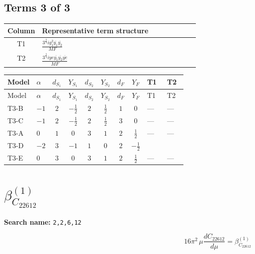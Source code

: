 \documentclass[8pt]{article}
\begin{document}
\begin{landscape}
\subsection*{Terms 3 of 3}
\begin{center}
\begin{tabular}{@{}c >{\raggedright\arraybackslash}p{0.82\linewidth}@{}}
\toprule
Column & Representative term structure \\
\midrule
T1 & \(\displaystyle \frac{3^{\frac{3}{4}} i g_{1}^{2} \overline{y_{1}} \overline{y_{2}}}{MF}\) \\
\midrule
T2 & \(\displaystyle \frac{3^{\frac{3}{4}} i ye \overline{y_{1}} \overline{y_{2}} \overline{ye}}{MF}\) \\
\midrule
\bottomrule
\end{tabular}
\end{center}
\smallskip
\tiny
\begin{longtable}{@{}llcccccc >{\raggedright\arraybackslash}p{0.21\linewidth} >{\raggedright\arraybackslash}p{0.21\linewidth}@{}}
\toprule
Model & $\alpha$ & $d_{S_1}$ & $Y_{S_1}$ & $d_{S_2}$ & $Y_{S_2}$ & $d_F$ & $Y_F$ & T1 & T2 \\
\midrule
\endfirsthead
\toprule
Model & $\alpha$ & $d_{S_1}$ & $Y_{S_1}$ & $d_{S_2}$ & $Y_{S_2}$ & $d_F$ & $Y_F$ & T1 & T2 \\
\midrule
\endhead
T3-B & $-1$ & $2$ & $-\frac{1}{2}$ & $2$ & $\frac{1}{2}$ & $1$ & $0$ & --- & --- \\
\midrule
T3-C & $-1$ & $2$ & $-\frac{1}{2}$ & $2$ & $\frac{1}{2}$ & $3$ & $0$ & --- & --- \\
\midrule
T3-A & $0$ & $1$ & $0$ & $3$ & $1$ & $2$ & $\frac{1}{2}$ & --- & --- \\
\midrule
T3-D & $-2$ & $3$ & $-1$ & $1$ & $0$ & $2$ & $-\frac{1}{2}$ & \scriptsize\adjustbox{max width=\linewidth}{$\begin{gathered} - \frac{3^{\frac{3}{4}} i g_{1}^{2} \overline{y_{1}} \overline{y_{2}}}{8 MF}\end{gathered}$} & \scriptsize\adjustbox{max width=\linewidth}{$\begin{gathered} \frac{3^{\frac{3}{4}} i ye \overline{y_{1}} \overline{y_{2}} \overline{ye}}{12 MF}\end{gathered}$} \\
\midrule
T3-E & $0$ & $3$ & $0$ & $3$ & $1$ & $2$ & $\frac{1}{2}$ & --- & --- \\
\midrule
\bottomrule
\end{longtable}
\clearpage
\section*{$\beta_{C_{22612}}^{(1)}$}
\noindent\textbf{Search name: }\texttt{2,2,6,12}\par\smallskip
\[16\pi^2\,\mu\frac{d C_{22612}}{d\mu}=\beta_{C_{22612}}^{(1)}\]

\end{landscape}
\end{document}
